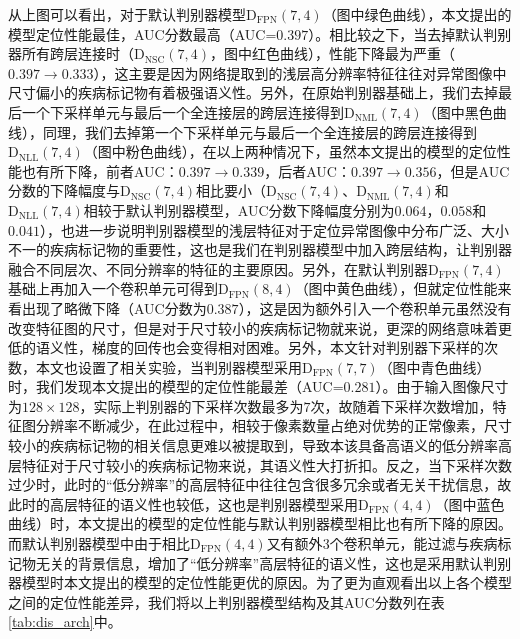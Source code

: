 从上图可以看出，对于默认判别器模型$\mathrm{D}_\mathrm{FPN}(7,4)$（图中绿色曲线），本文提出的模型定位性能最佳，AUC分数最高（AUC=$0.397$）。相比较之下，当去掉默认判别器所有跨层连接时（$\mathrm{D}_\mathrm{NSC}(7,4)$，图中红色曲线），性能下降最为严重（$0.397\rightarrow 0.333$），这主要是因为网络提取到的浅层高分辨率特征往往对异常图像中尺寸偏小的疾病标记物有着极强语义性。另外，在原始判别器基础上，我们去掉最后一个下采样单元与最后一个全连接层的跨层连接得到$\mathrm{D}_\mathrm{NML}(7,4)$（图中黑色曲线），同理，我们去掉第一个下采样单元与最后一个全连接层的跨层连接得到$\mathrm{D}_\mathrm{NLL}(7,4)$（图中粉色曲线），在以上两种情况下，虽然本文提出的模型的定位性能也有所下降，前者AUC：$0.397\rightarrow 0.339$，后者AUC：$0.397\rightarrow 0.356$，但是AUC分数的下降幅度与$\mathrm{D}_\mathrm{NSC}(7,4)$相比要小（$\mathrm{D}_\mathrm{NSC}(7,4)$、$\mathrm{D}_\mathrm{NML}(7,4)$和$\mathrm{D}_\mathrm{NLL}(7,4)$相较于默认判别器模型，AUC分数下降幅度分别为$0.064$，$0.058$和$0.041$），也进一步说明判别器模型的浅层特征对于定位异常图像中分布广泛、大小不一的疾病标记物的重要性，这也是我们在判别器模型中加入跨层结构，让判别器融合不同层次、不同分辨率的特征的主要原因。另外，在默认判别器$\mathrm{D}_\mathrm{FPN}(7,4)$基础上再加入一个卷积单元可得到$\mathrm{D}_\mathrm{FPN}(8,4)$（图中黄色曲线），但就定位性能来看出现了略微下降（AUC分数为$0.387$），这是因为额外引入一个卷积单元虽然没有改变特征图的尺寸，但是对于尺寸较小的疾病标记物就来说，更深的网络意味着更低的语义性，梯度的回传也会变得相对困难。另外，本文针对判别器下采样的次数，本文也设置了相关实验，当判别器模型采用$\mathrm{D}_\mathrm{FPN}(7,7)$（图中青色曲线）时，我们发现本文提出的模型的定位性能最差（AUC=$0.281$）。由于输入图像尺寸为$128\times 128$，实际上判别器的下采样次数最多为$7$次，故随着下采样次数增加，特征图分辨率不断减少，在此过程中，相较于像素数量占绝对优势的正常像素，尺寸较小的疾病标记物的相关信息更难以被提取到，导致本该具备高语义的低分辨率高层特征对于尺寸较小的疾病标记物来说，其语义性大打折扣。反之，当下采样次数过少时，此时的“低分辨率”的高层特征中往往包含很多冗余或者无关干扰信息，故此时的高层特征的语义性也较低，这也是判别器模型采用$\mathrm{D}_\mathrm{FPN}(4,4)$（图中蓝色曲线）时，本文提出的模型的定位性能与默认判别器模型相比也有所下降的原因。而默认判别器模型中由于相比$\mathrm{D}_\mathrm{FPN}(4,4)$又有额外$3$个卷积单元，能过滤与疾病标记物无关的背景信息，增加了“低分辨率”高层特征的语义性，这也是采用默认判别器模型时本文提出的模型的定位性能更优的原因。为了更为直观看出以上各个模型之间的定位性能差异，我们将以上判别器模型结构及其AUC分数列在表\ref{tab:dis_arch}中。

